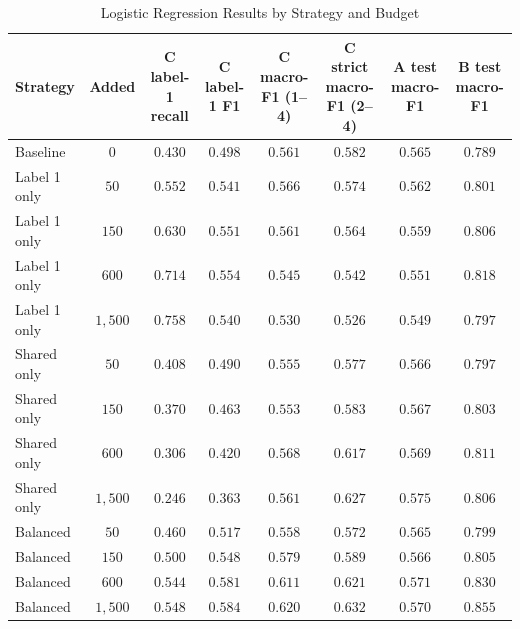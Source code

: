\documentclass[letterpaper,conference,compsoc,onecolumn]{IEEEtran}
\begin{document}
\begin{table}[h]
  \centering
  \caption{Logistic Regression Results by Strategy and Budget}
  \label{table:lr_strategy_budget}
  \begin{tabular}{lccccccc}
    \hline
    \textbf{Strategy} & \textbf{Added} & \textbf{C label-1 recall} & \textbf{C label-1 F1} & \textbf{C macro-F1 (1--4)} & \textbf{C strict macro-F1 (2--4)} & \textbf{A test macro-F1} & \textbf{B test macro-F1}\\
    \hline
    Baseline    & $0$     & $0.430$ & $0.498$ & $0.561$ & $0.582$ & $0.565$ & $0.789$\\
    Label 1 only & $50$    & $0.552$ & $0.541$ & $0.566$ & $0.574$ & $0.562$ & $0.801$\\
    Label 1 only & $150$   & $0.630$ & $0.551$ & $0.561$ & $0.564$ & $0.559$ & $0.806$\\
    Label 1 only & $600$   & $0.714$ & $0.554$ & $0.545$ & $0.542$ & $0.551$ & $0.818$\\
    Label 1 only & $1,500$ & $0.758$ & $0.540$ & $0.530$ & $0.526$ & $0.549$ & $0.797$\\
    Shared only  & $50$    & $0.408$ & $0.490$ & $0.555$ & $0.577$ & $0.566$ & $0.797$\\
    Shared only  & $150$   & $0.370$ & $0.463$ & $0.553$ & $0.583$ & $0.567$ & $0.803$\\
    Shared only  & $600$   & $0.306$ & $0.420$ & $0.568$ & $0.617$ & $0.569$ & $0.811$\\
    Shared only  & $1,500$ & $0.246$ & $0.363$ & $0.561$ & $0.627$ & $0.575$ & $0.806$\\
    Balanced     & $50$    & $0.460$ & $0.517$ & $0.558$ & $0.572$ & $0.565$ & $0.799$\\
    Balanced     & $150$   & $0.500$ & $0.548$ & $0.579$ & $0.589$ & $0.566$ & $0.805$\\
    Balanced     & $600$   & $0.544$ & $0.581$ & $0.611$ & $0.621$ & $0.571$ & $0.830$\\
    Balanced     & $1,500$ & $0.548$ & $0.584$ & $0.620$ & $0.632$ & $0.570$ & $0.855$\\
    \hline
  \end{tabular}
\end{table}
\end{document}

